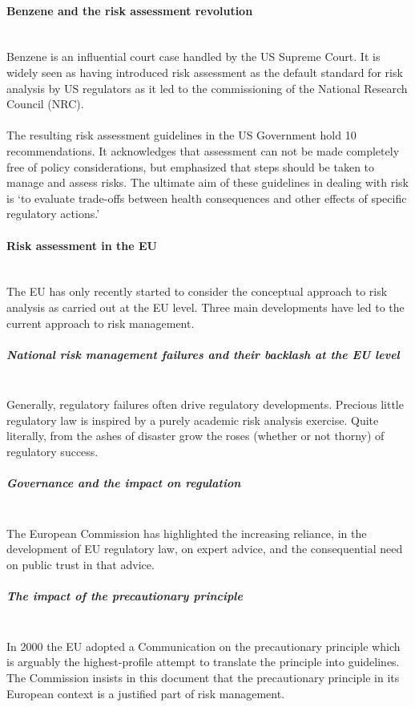 \documentclass[../summary.tex]{subfiles}
\begin{document}
			\paragraph{Benzene and the risk assessment revolution}\mbox{}\\
				Benzene is an influential court case handled by the US Supreme Court. It is widely seen as having introduced risk assessment as the default standard for risk analysis by US regulators as it led to the commissioning of the National Research Council (NRC). \\
				\\
				The resulting risk assessment guidelines in the US Government hold 10 recommendations. It acknowledges that assessment can not be made completely free of policy considerations, but emphasized that steps should be taken to  manage and assess risks. The ultimate aim of these guidelines in dealing with risk is `to evaluate trade-offs between health consequences and other effects of specific regulatory actions.' 
				
			\paragraph{Risk assessment in the EU}\mbox{}\\
				The EU has only recently started to consider the conceptual approach to risk analysis as carried out at the EU level. Three main developments have led to the current approach to risk management. 
				
				\subparagraph{National risk management failures and their backlash at the EU level}\mbox{}\\
					Generally, regulatory failures often drive regulatory developments. Precious little regulatory law is inspired by a purely academic risk analysis exercise. Quite literally, from the ashes of disaster grow the roses (whether or not thorny) of regulatory success.
				
				\subparagraph{Governance and the impact on regulation}\mbox{}\\
					The European Commission has highlighted the increasing reliance, in the development of EU regulatory law, on expert advice, and the consequential need on public trust in that advice.
					
				\subparagraph{The impact of the precautionary principle}\mbox{}\\
					In 2000 the EU adopted a Communication on the precautionary principle which is arguably the highest-profile attempt to translate the principle into guidelines. The Commission insists in this document that the precautionary principle in its European context is a justified part of risk management.
					
\end{document}
